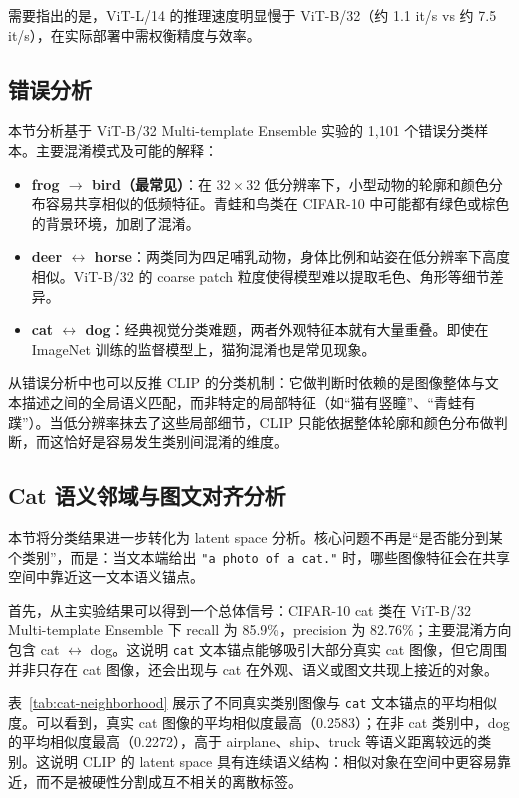 \documentclass[12pt,a4paper]{ctexart}
\begin{document}
需要指出的是，ViT-L/14 的推理速度明显慢于 ViT-B/32（约 1.1 it/s vs 约 7.5 it/s），在实际部署中需权衡精度与效率。

\subsection{错误分析}

本节分析基于 ViT-B/32 Multi-template Ensemble 实验的 1,101 个错误分类样本。主要混淆模式及可能的解释：

\begin{itemize}
    \item \textbf{frog $\to$ bird（最常见）}：在 $32\times32$ 低分辨率下，小型动物的轮廓和颜色分布容易共享相似的低频特征。青蛙和鸟类在 CIFAR-10 中可能都有绿色或棕色的背景环境，加剧了混淆。
    \item \textbf{deer $\leftrightarrow$ horse}：两类同为四足哺乳动物，身体比例和站姿在低分辨率下高度相似。ViT-B/32 的 coarse patch 粒度使得模型难以提取毛色、角形等细节差异。
    \item \textbf{cat $\leftrightarrow$ dog}：经典视觉分类难题，两者外观特征本就有大量重叠。即使在 ImageNet 训练的监督模型上，猫狗混淆也是常见现象。
\end{itemize}

从错误分析中也可以反推 CLIP 的分类机制：它做判断时依赖的是图像整体与文本描述之间的全局语义匹配，而非特定的局部特征（如“猫有竖瞳”、“青蛙有蹼”）。当低分辨率抹去了这些局部细节，CLIP 只能依据整体轮廓和颜色分布做判断，而这恰好是容易发生类别间混淆的维度。

\subsection{Cat 语义邻域与图文对齐分析}

本节将分类结果进一步转化为 latent space 分析。核心问题不再是“是否能分到某个类别”，而是：当文本端给出 \texttt{"a photo of a cat."} 时，哪些图像特征会在共享空间中靠近这一文本语义锚点。

首先，从主实验结果可以得到一个总体信号：CIFAR-10 cat 类在 ViT-B/32 Multi-template Ensemble 下 recall 为 85.9\%，precision 为 82.76\%；主要混淆方向包含 cat $\leftrightarrow$ dog。这说明 \texttt{cat} 文本锚点能够吸引大部分真实 cat 图像，但它周围并非只存在 cat 图像，还会出现与 cat 在外观、语义或图文共现上接近的对象。

表~\ref{tab:cat-neighborhood} 展示了不同真实类别图像与 \texttt{cat} 文本锚点的平均相似度。可以看到，真实 cat 图像的平均相似度最高（0.2583）；在非 cat 类别中，dog 的平均相似度最高（0.2272），高于 airplane、ship、truck 等语义距离较远的类别。这说明 CLIP 的 latent space 具有连续语义结构：相似对象在空间中更容易靠近，而不是被硬性分割成互不相关的离散标签。
\end{document}
